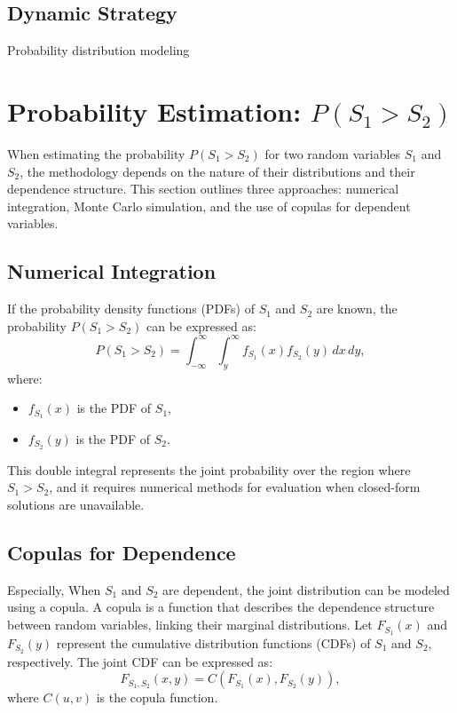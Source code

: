 \subsection{Dynamic Strategy}
Probability distribution modeling

\section{Probability Estimation: $P(S_1 > S_2)$}

When estimating the probability $P(S_1 > S_2)$ for two random variables $S_1$ and $S_2$, the methodology depends on the nature of their distributions and their dependence structure. This section outlines three approaches: numerical integration, Monte Carlo simulation, and the use of copulas for dependent variables.

\subsection{Numerical Integration}

If the probability density functions (PDFs) of $S_1$ and $S_2$ are known, the probability $P(S_1 > S_2)$ can be expressed as:
\begin{equation}
P(S_1 > S_2) = \int_{-\infty}^\infty \int_{y}^\infty f_{S_1}(x) f_{S_2}(y) \, dx \, dy,
\end{equation}
where:
\begin{itemize}
    \item $f_{S_1}(x)$ is the PDF of $S_1$,
    \item $f_{S_2}(y)$ is the PDF of $S_2$.
\end{itemize}

This double integral represents the joint probability over the region where $S_1 > S_2$, and it requires numerical methods for evaluation when closed-form solutions are unavailable.


\subsection{Copulas for Dependence}

Especially, When $S_1$ and $S_2$ are dependent, the joint distribution can be modeled using a copula. A copula is a function that describes the dependence structure between random variables, linking their marginal distributions. Let $F_{S_1}(x)$ and $F_{S_2}(y)$ represent the cumulative distribution functions (CDFs) of $S_1$ and $S_2$, respectively. The joint CDF can be expressed as:
\begin{equation}
F_{S_1, S_2}(x, y) = C(F_{S_1}(x), F_{S_2}(y)),
\end{equation}
where $C(u, v)$ is the copula function.

